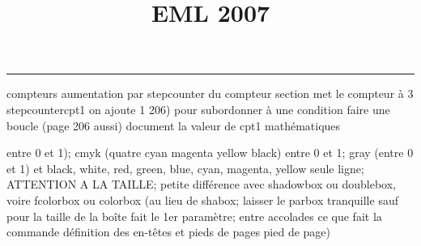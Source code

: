 \documentclass[11pt]{article}%
\title{\bf \vspace{-2cm} EML 2007} %
\author{} %
\date{} %
\renewcommand{\headrulewidth}{0pt}%
\renewcommand{\footrulewidth}{0.4pt}%
\begin{document}
\maketitle %
\vspace{-1.4cm}\hrule %
\thispagestyle{fancy}

\vspace*{.2cm}



compteurs%
aumentation par stepcounter du compteur section%
met le compteur à 3%
stepcounter{cpt1} on ajoute 1%
206) pour subordonner à une condition %
faire une boucle (page 206 aussi) %
document la valeur de cpt1 
mathématiques\newcommand{\ch}{\operatorname{ch}} 
\newcommand{\sh}{\operatorname{sh}}
\renewcommand{\tanh}{\operatorname{th}}
\renewcommand{\sinh}{\operatorname{sh}}
\renewcommand{\cosh}{\operatorname{ch}}
\newcommand{\argsh}{\operatorname{argsh}}
\newcommand{\argch}{\operatorname{argch}}
\newcommand{\argth}{\operatorname{argth}}
\newcommand{\ker}{\operatorname{Ker}}
\renewcommand{\im}{\operatorname{Im}}
\newcommand{\rg}{\operatorname{rg}}
\newcommand{\Id}{\operatorname{Id}}
\newcommand{\id}{\operatorname{id}}
\renewcommand{\leq}{\leq}
\renewcommand{\geq}{\geq }

entre 0 et 1); cmyk (quatre cyan magenta yellow black) entre 0 et 1;
gray (entre 0 et 1) et black, white, red, green, blue, cyan, magenta,
yellow%
seule ligne; ATTENTION A LA TAILLE; petite différence avec shadowbox ou
doublebox, voire fcolorbox ou colorbox (au lieu de shabox; laisser le
parbox tranquille sauf pour la taille de la boîte
\newcommand{\Tbox}[1]{\begin{center} \shabox{\parbox{0.6
\linewidth}{#1}} \end{center}} %
fait le 1er paramètre; entre accolades ce que fait la commande
définition des en-têtes et pieds de pages\pagestyle{fancy}
\chead{}
\rfoot[ \ \thepage]{\thepage}
\cfoot{}
\lfoot{}
\thispagestyle{fancy} %
pied de page)\renewcommand{\footrulewidth}{0.4pt}
\renewcommand{\headrulewidth}{0.4pt}
\end{document}
